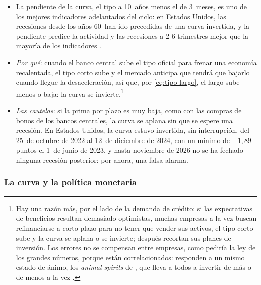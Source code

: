 \documentclass[11pt]{article}
\begin{document}
\begin{itemize}
\item La pendiente de la curva, el tipo a 10~años menos el de 3~meses, es uno de los mejores indicadores adelantados del ciclo: en Estados Unidos, las recesiones desde los años 60~han ido precedidas de una curva invertida, y la pendiente predice la actividad y las recesiones a 2-6 trimestres mejor que la mayoría de los indicadores\nocite{EstrellaHardouvelis1991Term,EstrellaMishkin1998} .
\item \emph{Por qué}: cuando el banco central sube el tipo oficial para frenar una economía recalentada, el tipo corto sube y el mercado anticipa que tendrá que bajarlo cuando llegue la desaceleración, así que, por \eqref{eq:tipo-largo}, el largo sube menos o baja: la curva se invierte.\footnote{Hay una razón más, por el lado de la demanda de crédito: si las expectativas de beneficios resultan demasiado optimistas, muchas empresas a la vez buscan refinanciarse a corto plazo para no tener que vender sus activos, el tipo corto sube y la curva se aplana o se invierte; después recortan sus planes de inversión. Los errores no se compensan entre empresas, como pediría la ley de los grandes números, porque están correlacionados: responden a un mismo estado de ánimo, los \emph{animal spirits} de \textcite{Keynes1936}, que lleva a todos a invertir de más o de menos a la vez .}
\item \emph{Las cautelas}: si la prima por plazo es muy baja, como con las compras de bonos de los bancos centrales, la curva se aplana sin que se espere una recesión. En Estados Unidos, la curva estuvo invertida, sin interrupción, del 25~de octubre de 2022 al 12~de diciembre de 2024, con un mínimo de $-1{,}89$ puntos el 1~de junio de 2023\nocite{UST2026ParYield}, y hasta noviembre de 2026 no se ha fechado ninguna recesión posterior\nocite{NBER2026Fechado}: por ahora, una falsa alarma.
\end{itemize}

\subsubsection{La curva y la política monetaria}\label{sec:curva-politica}
\end{document}
